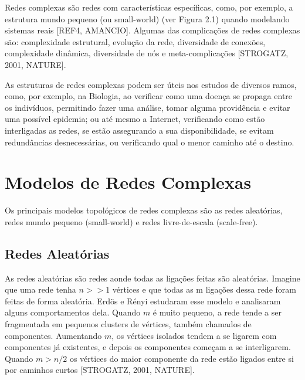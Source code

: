 \documentclass[xindy,rascunho]{fei}
\begin{document}
Redes complexas são redes com características específicas, como, por exemplo, a estrutura mundo pequeno (ou small-world) (ver Figura 2.1) quando modelando sistemas reais [REF4, AMANCIO]. Algumas das complicações de redes complexas são: complexidade estrutural, evolução da rede, diversidade de conexões, complexidade dinâmica, diversidade de nós e meta-complicações [STROGATZ, 2001, NATURE].

As estruturas de redes complexas podem ser úteis nos estudos de diversos ramos, como, por exemplo, na Biologia, ao verificar como uma doença se propaga entre os indivíduos, permitindo fazer uma análise, tomar alguma providência e evitar uma possível epidemia; ou até mesmo a Internet, verificando como estão interligadas as redes, se estão assegurando a sua disponibilidade, se evitam redundâncias desnecessárias, ou verificando qual o menor caminho até o destino.

\section{Modelos de Redes Complexas}

Os principais modelos topológicos de redes complexas são as redes aleatórias, redes mundo pequeno (small-world) e redes livre-de-escala (scale-free).

\subsection{Redes Aleatórias}

As redes aleatórias são redes aonde todas as ligações feitas são aleatórias. Imagine que uma rede tenha $n>>1$ vértices e que todas as m ligações dessa rede foram feitas de forma aleatória. Erdös e Rényi estudaram esse modelo e analisaram alguns comportamentos dela. Quando $m$ é muito pequeno, a rede tende a ser fragmentada em pequenos clusters de vértices, também chamados de componentes. Aumentando $m$, os vértices isolados tendem a se ligarem com componentes já existentes, e depois os componentes começam a se interligarem. Quando $m>n/2$ os vértices do maior componente da rede estão ligados entre si por caminhos curtos [STROGATZ, 2001, NATURE].
\end{document}
